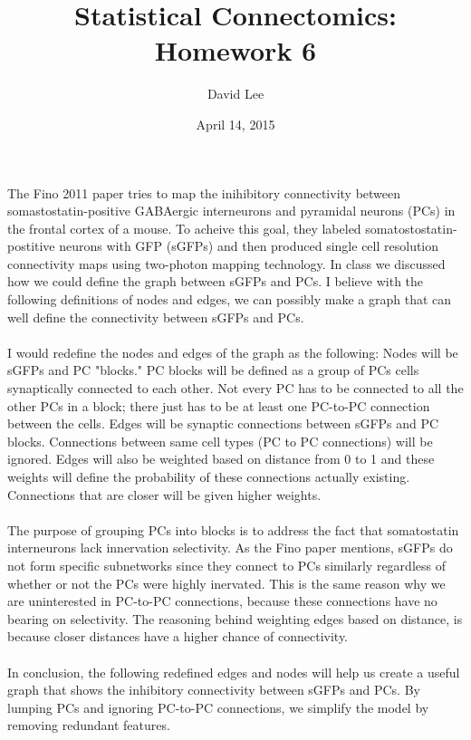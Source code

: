 \documentclass[12pt]{article}
\title{Statistical Connectomics: Homework 6}
\author{David Lee}
\date{April 14, 2015}
\begin{document}
\maketitle
\paragraph {}

The Fino 2011 paper tries to map the inihibitory connectivity between somastostatin-positive GABAergic interneurons and pyramidal neurons (PCs) in the frontal cortex of a mouse.  To acheive this goal, they labeled somatostostatin-postitive neurons with GFP (sGFPs) and then produced single cell resolution connectivity maps using two-photon mapping technology.  In class we discussed how we could define the graph between sGFPs and PCs.  I believe with the following definitions of nodes and edges, we can possibly make a graph that can well define the connectivity between sGFPs and PCs.

\paragraph {}
I would redefine the nodes and edges of the graph as the following: Nodes will be sGFPs and PC "blocks."  PC blocks will be defined as a group of PCs cells synaptically connected to each other.  Not every PC has to be connected to all the other PCs in a block; there just has to be at least one PC-to-PC connection between the cells.  Edges will be synaptic connections between sGFPs and PC blocks.  Connections between same cell types (PC to PC connections) will be ignored.  Edges will also be weighted based on distance from 0 to 1 and these weights will define the probability of these connections actually existing.  Connections that are closer will be given higher weights.

\paragraph {}
The purpose of grouping PCs into blocks is to address the fact that somatostatin interneurons lack innervation selectivity.  As the Fino paper mentions, sGFPs do not form specific subnetworks since they connect to PCs similarly regardless of whether or not the PCs were highly inervated.  This is the same reason why we are uninterested in PC-to-PC connections, because these connections have no bearing on selectivity.  The reasoning behind weighting edges based on distance, is because closer distances have a higher chance of connectivity.   

\paragraph {}
In conclusion, the following redefined edges and nodes will help us create a useful graph that shows the inhibitory connectivity between sGFPs and PCs.  By lumping PCs and ignoring PC-to-PC connections, we simplify the model by removing redundant features.
\end{document}
